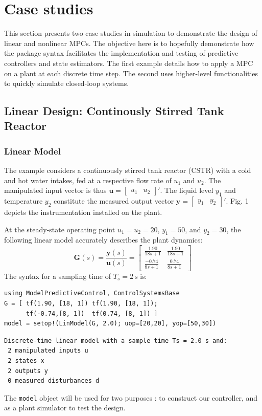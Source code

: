 \section{Case studies}

This section presents two case studies in simulation to demonstrate the design of linear and nonlinear MPCs. The objective here is to hopefully demonstrate how the package syntax facilitates the implementation and testing of predictive controllers and state estimators. The first example details how to apply a MPC on a plant at each discrete time step. The second uses higher-level functionalities to quickly simulate closed-loop systems. 

\subsection{Linear Design: Continously Stirred Tank Reactor}

\subsubsection{Linear Model}

The example considers a continuously stirred tank reactor (CSTR) with a cold and hot water intakes, fed at a respective flow rate of $u_1$ and $u_2$. The manipulated input vector is thus $\mathbf{u} = [\begin{smallmatrix}u_1 & u_2\end{smallmatrix}]'$. The liquid level $y_1$ and temperature $y_2$ constitute the measured output vector $\mathbf{y} = [\begin{smallmatrix}y_1 & y_2\end{smallmatrix}]'$. Fig. 1 depicts the instrumentation installed on the plant.

At the steady-state operating point $u_1=u_2=20$, $y_1=50$, and $y_2=30$, the following linear model accurately describes the plant dynamics:
\begin{equation}
\mathbf{G}(s) = \frac{\mathbf{y}(s)}{\mathbf{u}(s)} =
\begin{bmatrix}
    \frac{1.90}{18s+1} & \frac{1.90}{18s+1} \\[3pt]
    \frac{-0.74}{8s+1} & \frac{0.74}{8s+1}
\end{bmatrix}
\end{equation}
The syntax for a sampling time of $T_s=\SI{2}{\second}$ is:
\begin{verbatim}
using ModelPredictiveControl, ControlSystemsBase
G = [ tf(1.90, [18, 1]) tf(1.90, [18, 1]);
      tf(-0.74,[8, 1])  tf(0.74, [8, 1]) ]
model = setop!(LinModel(G, 2.0); uop=[20,20], yop=[50,30])
\end{verbatim}
\spacerepl
\begin{verbatim}
Discrete-time linear model with a sample time Ts = 2.0 s and:
 2 manipulated inputs u
 2 states x
 2 outputs y
 0 measured disturbances d
\end{verbatim}
The \texttt{model} object will be used for two purposes : to construct our controller, and as a plant simulator to test the design.

